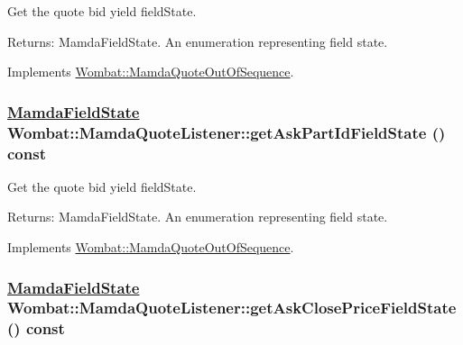 Get the quote bid yield field\-State. 

\begin{Desc}
\item[Returns:]Mamda\-Field\-State. An enumeration representing field state. \end{Desc}


Implements \hyperlink{classWombat_1_1MamdaQuoteOutOfSequence_60ddd7a94b309e3a80aec05000be0c0e}{Wombat::Mamda\-Quote\-Out\-Of\-Sequence}.\hypertarget{classWombat_1_1MamdaQuoteListener_9208a03480064d6bd80ed3b95136c752}{
\subsubsection[getAskPartIdFieldState]{\setlength{\rightskip}{0pt plus 5cm}\hyperlink{namespaceWombat_93aac974f2ab713554fd12a1fa3b7d2a}{Mamda\-Field\-State} Wombat::Mamda\-Quote\-Listener::get\-Ask\-Part\-Id\-Field\-State () const}}
\label{classWombat_1_1MamdaQuoteListener_9208a03480064d6bd80ed3b95136c752}


Get the quote bid yield field\-State. 

\begin{Desc}
\item[Returns:]Mamda\-Field\-State. An enumeration representing field state. \end{Desc}


Implements \hyperlink{classWombat_1_1MamdaQuoteOutOfSequence_bf3a795aa218100f1d59fa05aec2748e}{Wombat::Mamda\-Quote\-Out\-Of\-Sequence}.\hypertarget{classWombat_1_1MamdaQuoteListener_a6dcf6a065420d6fdf9d5e07093ed603}{
\subsubsection[getAskClosePriceFieldState]{\setlength{\rightskip}{0pt plus 5cm}\hyperlink{namespaceWombat_93aac974f2ab713554fd12a1fa3b7d2a}{Mamda\-Field\-State} Wombat::Mamda\-Quote\-Listener::get\-Ask\-Close\-Price\-Field\-State () const}}
\label{classWombat_1_1MamdaQuoteListener_a6dcf6a065420d6fdf9d5e07093ed603}


